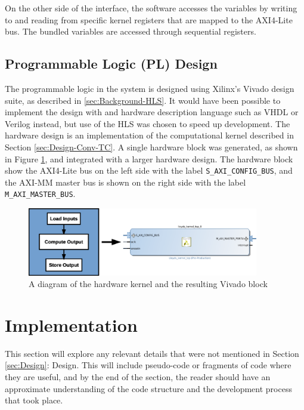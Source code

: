 \documentclass[12pt]{article}
\begin{document}
On the other side of the interface, the software accesses the variables by writing to and reading from specific kernel registers that are mapped to the AXI4-Lite bus. The bundled variables are accessed through sequential registers.

\subsection{Programmable Logic (PL) Design}
\label{sec:Design-PL}

The programmable logic in the system is designed using Xilinx's Vivado design suite, as described in \ref{sec:Background-HLS}. It would have been possible to implement the design with and hardware description language such as VHDL or Verilog instead, but use of the HLS was chosen to speed up development. The hardware design is an implementation of the computational kernel described in Section \ref{sec:Design-Conv-TC}. A single hardware block was generated, as shown in Figure \ref{fig:hlsConv}, and integrated with a larger hardware design. The hardware block show the AXI4-Lite bus on the left side with the label \lstinline|S_AXI_CONFIG_BUS|, and the AXI-MM master bus is shown on the right side with the label \lstinline|M_AXI_MASTER_BUS|.

\begin{figure} [H]
\centering
\includegraphics[width=0.9\textwidth]{figures/hls_conv.eps}
\caption{A diagram of the hardware kernel and the resulting Vivado block} 
\label{fig:hlsConv}
\end{figure}

\newpage

\section{Implementation}
\label{sec:Imp}

This section will explore any relevant details that were not mentioned in Section \ref{sec:Design}: Design. This will include pseudo-code or fragments of code where they are useful, and by the end of the section, the reader should have an approximate understanding of the code structure and the development process that took place.
\end{document}

